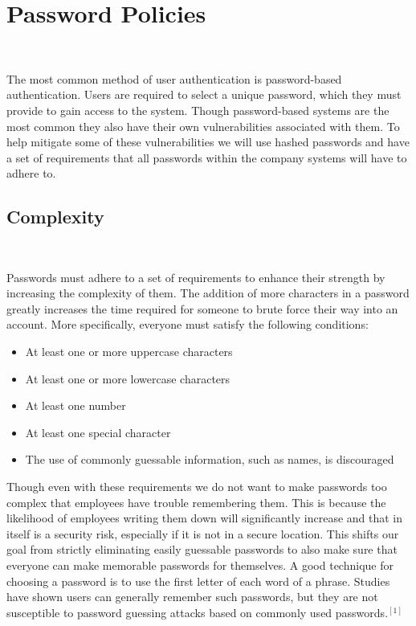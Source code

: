 \documentclass[12pt,a4paper]{report}
\begin{document}
\section{Password Policies}
\

The most common method of user authentication is password-based authentication. 
Users are required to select a unique password, which they must provide to gain access to the system. 
Though password-based systems are the most common they also have their own vulnerabilities associated with them. 
To help mitigate some of these vulnerabilities we will use hashed passwords and have a set of requirements that all passwords within the company systems will have to adhere to.

\subsection{Complexity}
\

Passwords must adhere to a set of requirements to enhance their strength by increasing the complexity of them. 
The addition of more characters in a password greatly increases the time required for someone to brute force their way into an account.
More specifically, everyone must satisfy the following conditions:
\begin{itemize}
 \item At least one or more uppercase characters
 \item At least one or more lowercase characters
 \item At least one number
 \item At least one special character
 \item The use of commonly guessable information, such as names, is discouraged
\end{itemize}

Though even with these requirements we do not want to make passwords too complex that employees have trouble remembering them.
This is because the likelihood of employees writing them down will significantly increase and that in itself is a security risk, especially if it is not in a secure location.
This shifts our goal from strictly eliminating easily guessable passwords to also make sure that everyone can make memorable passwords for themselves.
A good technique for choosing a password is to use the first letter of each word of a phrase. 
Studies have shown users can generally remember such passwords, but they are not susceptible to password guessing attacks based on commonly used passwords$.^{[1]}$
\end{document}
